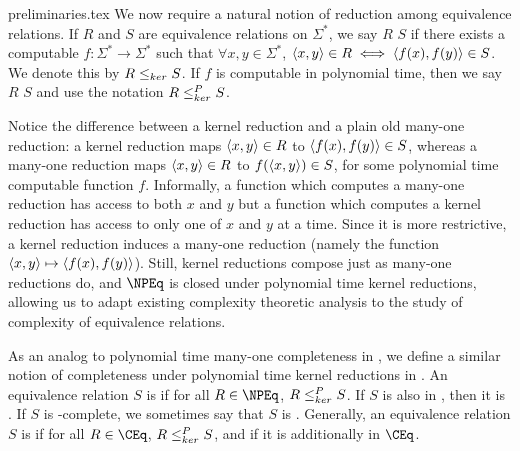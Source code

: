 \begin{filecontents}{preliminaries.tex}
We now require a natural notion of reduction among equivalence relations.
If $R$ and $S$ are equivalence relations on $\Sigma^*$, we say $R$  $S$ if there exists a computable $f\colon\Sigma^*\to\Sigma^*$ such that $\forall x,y\in\Sigma^*$, $\pair{x}{y}\in R\iff \pair{f(x)}{f(y)}\in S$.
We denote this by $R\krnt S$.
If $f$ is computable in polynomial time, then we say $R$  $S$ and use the notation $R\kr S$.

Notice the difference between a kernel reduction and a plain old many-one reduction: a kernel reduction maps $\pair{x}{y}\in R$ to $\pair{f(x)}{f(y)}\in S$, whereas a many-one reduction maps $\pair{x}{y}\in R$ to $f(\pair{x}{y})\in S$, for some polynomial time computable function $f$.
Informally, a function which computes a many-one reduction has access to both $x$ and $y$ but a function which computes a kernel reduction has access to only one of $x$ and $y$ at a time.
Since it is more restrictive, a kernel reduction induces a many-one reduction (namely the function $\pair{x}{y} \mapsto \pair{f(x)}{f(y)}$).
Still, kernel reductions compose just as many-one reductions do, and $\NPEq$ is closed under polynomial time kernel reductions, allowing us to adapt existing complexity theoretic analysis to the study of complexity of equivalence relations.

As an analog to polynomial time many-one completeness in \NP, we define a similar notion of completeness under polynomial time kernel reductions in \NPEq.
An equivalence relation $S$ is  if for all $R\in\NPEq$, $R\kr S$.
If $S$ is also in \NPEq, then it is .
If $S$ is \NPEq-complete, we sometimes say that $S$ is .
Generally, an equivalence relation $S$ is  if for all $R\in\CEq$, $R\kr S$, and  if it is additionally in $\CEq$.
\end{filecontents}
